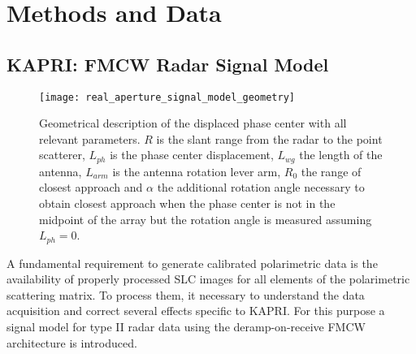 \section{Methods and Data}\label{sec:methods}
\subsection{KAPRI: FMCW Radar Signal Model}\label{sec:methods:signal_model}
\begin{figure*}[Ht!]
	\centering
	\texttt{[image: real\_aperture\_signal\_model\_geometry]}
	\caption{Geometrical description of the displaced phase center with all relevant parameters. $R$ is the slant range from the radar to the point scatterer, $L_{ph}$ is the phase center displacement, $L_{wg}$ the length of the antenna, $L_{arm}$ is the antenna rotation lever arm, $R_{0}$ the range of closest approach and $\alpha$ the additional rotation angle necessary to obtain closest approach when the phase center is not in the midpoint of the array but the rotation angle is measured assuming $L_{ph}=0$.}
	\label{fig:real_aperture_signal_model_geometry}
\end{figure*}
A fundamental requirement to generate calibrated polarimetric data is the availability of properly processed SLC images for all elements of the polarimetric scattering matrix. To process them, it necessary to understand the data acquisition and correct several effects specific to KAPRI.  
For this purpose a signal model for type II\cite{Caduff2015} radar data using the deramp-on-receive FMCW architecture\cite{Stove1992} is introduced.\\

